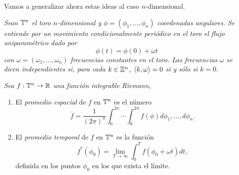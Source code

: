 Vamos a generalizar ahora estas ideas al caso $n$-dimensional.

\begin{defn}
  \em
  Sean $\mathbb{T}^n$ el toro $n$-dimensional y $\phi=(\phi_1,\dots,\phi_n)$ coordenadas angulares. Se entiende por un \emph{movimiento condicionalmente periódico} en el toro el flujo uniparamétrico dado por 
  \begin{equation*}
    \phi(t)=\phi(0)+\omega t
  \end{equation*}
  con $\omega=(\omega_1,\dots,\omega_n)$ \emph{frecuencias} constantes en el toro. Las frecuencias $\omega$ se dicen \emph{independientes} si, para cada $k \in \mathbb{Z}^n$,  $\left\langle k,\omega\right\rangle=0$ si y sólo si $k=0$.
\end{defn}
\begin{defn}
  \em
  Sea $f:\mathbb{T}^n \rightarrow \mathbb{R}$ una función integrable Riemann,
  \begin{enumerate}
    \item El \emph{promedio espacial} de $f$ en $\mathbb{T}^n$ es el número
      \begin{equation*}
	\bar{f}=\frac{1}{(2\pi)^n}\int_0^{2\pi} \cdots \int_0^{2\pi} f(\phi) d\phi_1,\dots,d\phi_n.
      \end{equation*}
    \item El \emph{promedio temporal} de $f$ en $\mathbb{T}^n$ es la función
      \begin{equation*}
	f^*(\phi_0)=\lim_{T\rightarrow \infty} \int_0^{T}f(\phi_0+\omega t) dt,
      \end{equation*}
      definida en los puntos $\phi_0$ en los que exista el límite.
  \end{enumerate}
\end{defn}

